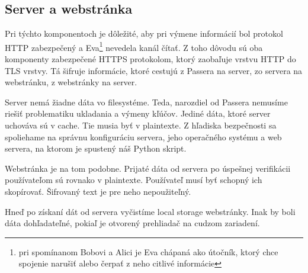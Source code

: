 \subsection{Server a webstránka}
Pri týchto komponentoch je dôležité, aby pri výmene informácií bol protokol HTTP zabezpečený a Eva\footnote{pri spomínanom Bobovi a Alici je Eva chápaná ako útočník, ktorý chce spojenie narušiť alebo čerpať z neho citlivé informácie} nevedela kanál čítať. Z toho dôvodu sú oba komponenty zabezpečené HTTPS protokolom, ktorý zaobaľuje vrstvu HTTP do TLS vrstvy. Tá šifruje informácie, ktoré cestujú z Passera na server, zo servera na webstránku, z webstránky na server.

Server nemá žiadne dáta vo filesystéme. Teda, narozdiel od Passera nemusíme riešiť problematiku ukladania a výmeny kľúčov. Jediné dáta, ktoré server uchováva sú v cache. Tie musia byť v plaintexte. Z hľadiska bezpečnosti sa spoliehame na správnu konfiguráciu servera, jeho operačného systému a web servera, na ktorom je spustený náš Python skript.

Webstránka je na tom podobne. Prijaté dáta od servera po úspešnej verifikácii používateľom sú rovnako v plaintexte. Používateľ musí byť schopný ich skopírovať. Šifrovaný text je pre neho nepoužiteľný.

Hneď po získaní dát od servera vyčistíme local storage webstránky. Inak by boli dáta dohľadateľné, pokiaľ je otvorený prehliadač na cudzom zariadení.